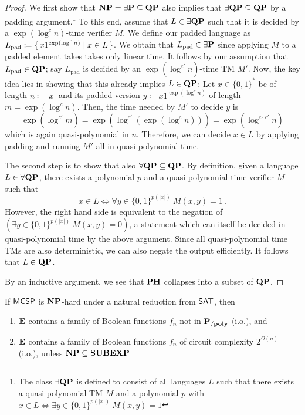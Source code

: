 \documentclass[12pt]{article}
\theoremstyle{definition}
\begin{document}
\begin{proof}
  We first show that $\NP = \exists \P \subseteq \class{QP}$ also implies that
  $\exists \class{QP} \subseteq \class{QP}$ by a padding
  argument.\footnote{The class $\exists \class{QP}$ is defined to consist of
  all languages $L$ such that there exists a quasi-polynomial TM $M$ and a
  polynomial $p$ with $x \in L \iff \exists y \in \{0,1\}^{p(|x|)}\
  M(x,y) = 1$}
  To this end, assume that $L \in \exists \class{QP}$ such that it is decided
  by a $\exp(\log^c n)$-time verifier $M$.
  We define our padded language as
  $L_{\textrm{pad}} \coloneqq \set{ x 1^{\exp(\log^c n)} \mid x \in L }$.
  We obtain that $L_{\textrm{pad}} \in \exists \P$ since applying $M$ to a
  padded element takes takes only linear time.
  It follows by our assumption that $L_{\textrm{pad}} \in \class{QP}$;
  say $L_{\textrm{pad}}$ is decided by an $\exp(\log^{c'} n)$-time TM $M'$.
  Now, the key idea lies in showing that this already implies
  $L \in \class{QP}$:
  Let $x \in \{0,1\}^*$ be of length $n \coloneqq |x|$ and
  its padded version $y \coloneqq x 1^{\exp(\log^c n)}$ of length
  $m = \exp(\log^c n)$. Then, the time needed by $M'$ to decide $y$ is
  \[
    \exp(\log^{c'} m)
    =
    \exp(\log^{c'}(\exp(\log^c n)))
    =
    \exp(\log^{c \cdot c'} n)
  \]
  which is again quasi-polynomial in $n$.
  Therefore, we can decide $x \in L$ by applying padding and running $M'$ all
  in quasi-polynomial time.

  The second step is to show that also
  $\forall \class{QP} \subseteq \class{QP}$.
  By definition, given a language $L \in \forall \class{QP}$, there exists a
  polynomial $p$ and a quasi-polynomial time verifier $M$ such that
  \[
    x \in L \iff \forall y \in \{0,1\}^{p(|x|)}\ M(x,y) = 1 \,.
  \]
  However, the right hand side is equivalent to the negation of
  $(\exists y \in \{0,1\}^{p(|x|)}\ M(x,y) = 0)$, a statement which can itself
  be decided in quasi-polynomial time by the above argument.
  Since all quasi-polynomial time TMs are also deterministic, we can also
  negate the output efficiently. It follows that $L \in \class{QP}$.

  By an inductive argument, we see that $\class{PH}$ collapses into a subset of
  $\class{QP}$.
\end{proof}

\bigskip

\begin{theorem}[Theorem 15]
If $\mathprob{MCSP}$ is $\NP$-hard under a natural reduction from $\mathprob{SAT}$, then
\begin{enumerate} [1.]
	\item $\class{E}$ contains a family of Boolean functions $f_n$ not in $\Ppoly$ (i.o.), and
	\item $\class{E}$ contains a family of Boolean functions $f_n$ of circuit complexity $2^{\Omega(n)}$ (i.o.), unless $\NP \subseteq \class{SUBEXP}$
\end{enumerate}
\end{theorem}
\end{document}
